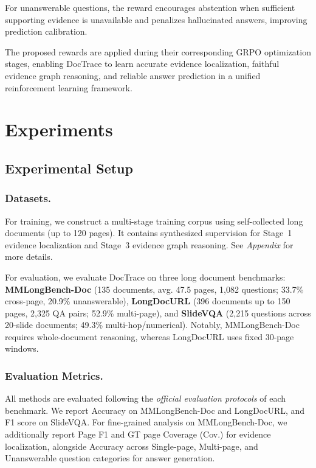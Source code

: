\documentclass[letterpaper]{article} %
\begin{document}
For unanswerable questions, the reward encourages abstention when sufficient supporting evidence is unavailable and penalizes hallucinated answers, improving prediction calibration.




The proposed rewards are applied during their corresponding GRPO optimization stages, enabling DocTrace to learn accurate evidence localization, faithful evidence graph reasoning, and reliable answer prediction in a unified reinforcement learning framework.













\section{Experiments}
\subsection{Experimental Setup}

\subsubsection{Datasets.}

For training, we construct a multi-stage training corpus using self-collected long documents (up to 120 pages). It contains synthesized supervision for Stage~1 evidence localization and Stage~3 evidence graph reasoning. See \emph{Appendix} for more details.

For evaluation, we evaluate DocTrace on three long document benchmarks: \textbf{MMLongBench-Doc} (135 documents, avg. 47.5 pages, 1,082 questions; 33.7\% cross-page, 20.9\% unanswerable), \textbf{LongDocURL} (396 documents up to 150 pages, 2,325 QA pairs; 52.9\% multi-page), and \textbf{SlideVQA} (2,215 questions across 20-slide documents; 49.3\% multi-hop/numerical). Notably, MMLongBench-Doc requires whole-document reasoning, whereas LongDocURL uses fixed 30-page windows.


\subsubsection{Evaluation Metrics.}
All methods are evaluated following the \emph{official evaluation protocols} of each benchmark. We report Accuracy on MMLongBench-Doc and LongDocURL, and F1 score on SlideVQA. For fine-grained analysis on MMLongBench-Doc, we additionally report Page F1 and GT page Coverage (Cov.) for evidence localization, alongside Accuracy across Single-page, Multi-page, and Unanswerable question categories for answer generation.
\end{document}

